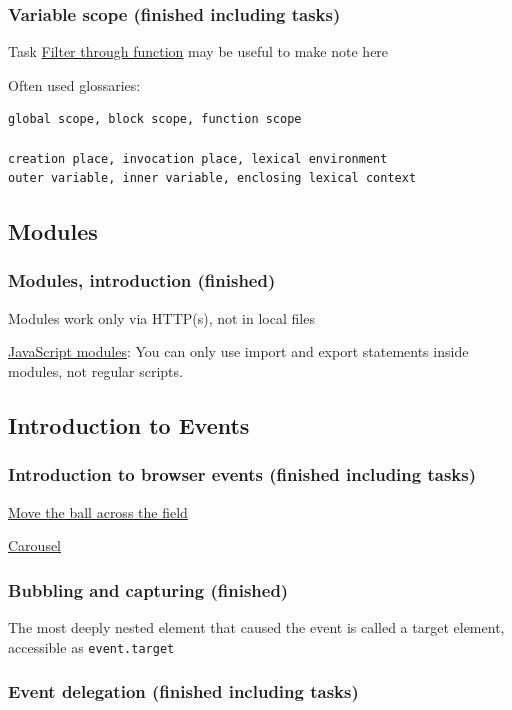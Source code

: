 \documentclass[a4paper, 12pt]{article}
\begin{document}
\subsubsection{Variable scope (finished including tasks)}
Task \href{https://javascript.info/closure#filter-through-function}{Filter through function} may be useful to make note here

\noindent Often used glossaries:
\begin{verbatim}
global scope, block scope, function scope

creation place, invocation place, lexical environment
outer variable, inner variable, enclosing lexical context
\end{verbatim}

\subsection{Modules}
\subsubsection{Modules, introduction (finished)}
Modules work only via HTTP(s), not in local files

\href{https://developer.mozilla.org/en-US/docs/Web/JavaScript/Guide/Modules}{JavaScript modules}: You can only use import and export statements inside modules, not regular scripts.

\subsection{Introduction to Events}
\subsubsection{Introduction to browser events (finished including tasks)}

\href{https://javascript.info/introduction-browser-events#move-the-ball-across-the-field}{Move the ball across the field}

\href{https://javascript.info/introduction-browser-events#carousel}{Carousel}

\subsubsection{Bubbling and capturing (finished)}
The most deeply nested element that caused the event is called a target element, accessible as \verb|event.target|

\subsubsection{Event delegation (finished including tasks)}
\end{document}
